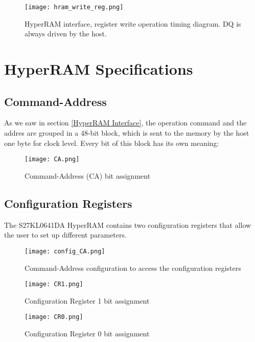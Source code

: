 \documentclass[10pt, english, a4paper, titlepage, oneside]{book}
\begin{document}
\vspace{6mm}
\begin{figure}[H]
    \centering
    \captionsetup{width=16.5cm}
    \texttt{[image: hram\_write\_reg.png]}
    \vspace{5mm}
    \caption{\centering HyperRAM interface, register write operation timing diagram. DQ is always driven by the host.}
    \label{hram_write_reg}
\end{figure}
\vspace{6mm}
\section{HyperRAM Specifications}
\vspace{4mm}
\subsection{Command-Address }
As we saw in section \ref{HyperRAM Interface}, the operation command and the addres are grouped in a 48-bit block, which is sent to the memory by the host one byte for clock level. Every bit of this block has its own meaning:
\vspace{4mm}
\begin{figure}[H]
    \centering
    \texttt{[image: CA.png]}
    \vspace{3mm}
    \caption{Command-Address (CA) bit assignment}
    \label{CA}
\end{figure}
\vspace{1mm}
\subsection{Configuration Registers}
The S27KL0641DA HyperRAM contains two configuration registers that allow the user to set up different parameters.
\vspace{2mm}
\begin{figure}[H]
    \centering
    \texttt{[image: config\_CA.png]}
    \vspace{3mm}
    \caption{Command-Address configuration to access the configuration registers}
    \label{config_CA}
\end{figure}
\vspace{1mm}
\begin{figure}[H]
    \centering
    \texttt{[image: CR1.png]}
    \vspace{3mm}
    \caption{Configuration Register 1 bit assignment}
    \label{config_CA}
\end{figure}
\begin{figure}[H]
    \centering
    \texttt{[image: CR0.png]}
    \vspace{3mm}
    \caption{Configuration Register 0 bit assignment}
    \label{config_CA}
\end{figure}
\vspace{1mm}
\end{document}
